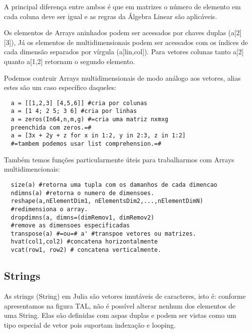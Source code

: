 A principal diferença entre ambos é que em matrizes o número de elemento em cada coluna deve ser igual e as regras da Álgebra Linear são aplicáveis. 


Os elementos de Arrays aninhados podem ser acessados por chaves duplas (a[2][3]), Já os elementos de multidimensionais podem ser acessados com os índices de cada dimensão separados por vírgula (a[lin,col]). Para vetores colunas tanto a[2] quanto a[1,2] retornam o segundo elemento. 

Podemos contruir Arrays multidimensionais de modo análogo aos vetores, alias estes são um caso específico daqueles:
\begin{lstlisting}
  a = [[1,2,3] [4,5,6]] #cria por colunas
  a = [1 4; 2 5; 3 6] #cria por linhas
  a = zeros(In64,n,m,g) #=cria uma matriz nxmxg 
  preenchida com zeros.=#
  a = [3x + 2y + z for x in 1:2, y in 2:3, z in 1:2] 
  #=tambem podemos usar list comprehension.=#
\end{lstlisting}

Também temos funções particularmente úteis para trabalharmos com Arrays multidimencionais:
\begin{lstlisting}
  size(a) #retorna uma tupla com os damanhos de cada dimencao
  ndimns(a) #retorna o numero de dimensoes.
  reshape(a,nElementDim1, nElementsDim2,...,nElementDimN) 
  #redimensiona o array.
  dropdimns(a, dimns=(dimRemov1, dimRemov2) 
  #remove as dimensoes especificadas
  transpose(a) #=ou=# a' #transpoe vetores ou matrizes.
  hvat(col1,col2) #concatena horizontalmente
  vcat(row1, row2) # concatena verticalmente. 
\end{lstlisting}
\subsection{Strings}
As strings (String) em Julia são vetores imutáveis de caracteres, isto é: conforme apresentamos na figura TAL, não é possível alterar nenhum dos elementos de uma String. 
Elas são definidas com aspas duplas e podem ser vistas como um tipo especial de vetor pois suportam indexação e looping.



